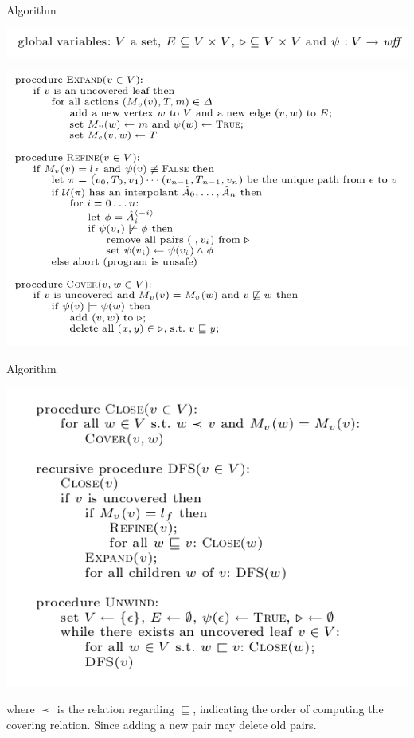 \documentclass[aspectratio=1610, 13pt]{beamer}
\begin{document}
\begin{frame}{Algorithm}
\begin{center}
\includegraphics[scale=0.4]{5.png}

\includegraphics[scale=0.4]{6.png}
\end{center}
\end{frame}
\begin{frame}{Algorithm}
\begin{center}
\includegraphics[scale=0.4]{7.png}
\end{center}
where $\prec$ is the relation regarding $\sqsubseteq $, indicating the order of computing  the covering relation. Since adding a new pair may delete old pairs.
\end{frame}
\end{document}
